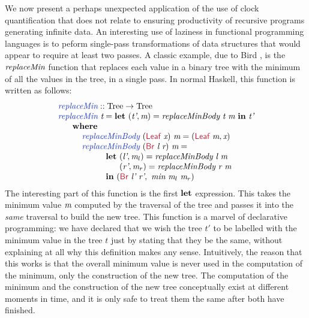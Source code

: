 We now present a perhaps unexpected application of the use of clock
quantification that does not relate to ensuring productivity of
recursive programs generating infinite data. An interesting use of
laziness in functional programming languages is to peform single-pass
transformations of data structures that would appear to require at
least two passes. A classic example, due to Bird
\cite{bird84circular}, is the $\textit{replaceMin}$ function that
replaces each value in a binary tree with the minimum of all the
values in the tree, in a single pass. In normal Haskell, this function
is written as follows:
\begin{displaymath}
  \begin{array}{l}
    \defn{replaceMin} :: \tyname{Tree} \to \tyname{Tree} \\
    \defn{replaceMin}\ \ident{t} = \kw{let}\ (\ident{t'}, \ident{m}) = \ident{replaceMinBody}\ \ident{t}\ \ident{m}\ \kw{in}\ \ident{t'} \\
    \hspace{0.6cm} \kw{where} \\
    \hspace{1cm} \defn{replaceMinBody}\ (\cons{Leaf}\ \ident{x})\ \ident{m} = (\cons{Leaf}\ \ident{m}, \ident{x}) \\
    \hspace{1cm} \defn{replaceMinBody}\ (\cons{Br}\ \ident{l}\ \ident{r})\ \ident{m} = \\
    \hspace{2cm} \kw{let}\ (\ident{l'}, \ident{m$_l$}) = \ident{replaceMinBody}\ \ident{l}\ \ident{m} \\
    \hspace{2cm} \textcolor{white}{\kw{let}\ }(\ident{r'}, \ident{m$_r$}) = \ident{replaceMinBody}\ \ident{r}\ \ident{m} \\
    \hspace{2cm} \kw{in}\ (\cons{Br}\ \ident{l'}\ \ident{r'},\ \ident{min}\ \ident{m$_l$}\ \ident{m$_r$})
  \end{array}
\end{displaymath}
The interesting part of this function is the first $\textbf{let}$
expression. This takes the minimum value $\textit{m}$ computed by the
traversal of the tree and passes it into the \emph{same} traversal to
build the new tree. This function is a marvel of declarative
programming: we have declared that we wish the tree $t'$ to be
labelled with the minimum value in the tree $t$ just by stating that
they be the same, without explaining at all why this definition makes
any sense. Intuitively, the reason that this works is that the overall
minimum value is never used in the computation of the minimum, only
the construction of the new tree. The computation of the minimum and
the construction of the new tree conceptually exist at different
moments in time, and it is only safe to treat them the same after both
have finished.


